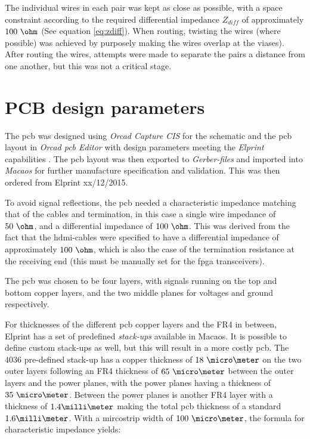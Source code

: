 \documentclass[main.tex]{subfiles}
\begin{document}
The individual wires in each pair was kept as close as possible, with a space constraint according to the required differential impedance $Z_{diff}$ of approximately $100\ \ohm$ (See equation \ref{eq:zdiff}). When routing, twisting the wires (where possible) was achieved by purposely making the wires overlap at the viases). After routing the wires, attempts were made to separate the pairs a distance from one another, but this was not a critical stage.

\section{PCB design parameters}

The \gls{pcb} was designed using \textit{Orcad Capture CIS} for the schematic and the \gls{pcb} layout in \textit{Orcad \gls{pcb} Editor} with design parameters meeting the \textit{Elprint} capabilities \cite{elprint15}. The \gls{pcb} layout was then exported to \textit{Gerber-files} and imported into \textit{Macaos} for further manufacture specification and validation. This was then ordered from Elprint xx/12/2015.

To avoid signal reflections, the \gls{pcb} needed a characteristic impedance matching that of the cables and termination, in this case a single wire impedance of $50\ \ohm$, and a differential impedance of $100\ \ohm$. This was derived from the fact that the \gls{hdmi}-cables were specified to have a differential impedance of approximately $100\ \ohm$, which is also the case of the termination resistance at the receiving end (this must be manually set for the \gls{fpga} transceivers).

The \gls{pcb} was chosen to be four layers, with signals running on the top and bottom copper layers, and the two middle planes for voltages and ground respectively.

For thicknesses of the different \gls{pcb} copper layers and the FR4 in between, Elprint has a set of predefined \textit{stack-ups} available in Macaos. It is possible to define custom stack-ups as well, but this will result in a more costly \gls{pcb}. The $4036$ pre-defined stack-up has a copper thickness of $18\ \micro\meter$ on the two outer layers following an FR4 thickness of $65\ \micro\meter$ between the outer layers and the power planes, with the power planes having a thickness of $35\ \micro\meter$. Between the power planes is another FR4 layer with a thickness of $1.4 \milli\meter$ making the total \gls{pcb} thickness of a standard $1.6 \milli\meter$. With a mircostrip width of $100\ \micro\meter$, the formula for characteristic impedance yields:
\end{document}
